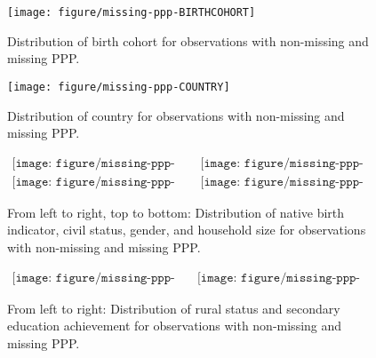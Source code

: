 \documentclass[letterpaper,11pt]{article}
\begin{document}
\begin{figure}[htb]
\centering \texttt{[image: figure/missing-ppp-BIRTHCOHORT]}
\protect\caption{Distribution of birth cohort for observations with non-missing and missing PPP.}


\label{fig:missing-birthcohort} 
\end{figure}


\begin{figure}[htb]
\centering \texttt{[image: figure/missing-ppp-COUNTRY]}
\protect\caption{Distribution of country for observations with non-missing and missing PPP.}


\label{fig:missing-country} 
\end{figure}


\begin{figure}[htb]
\begin{centering}
$\begin{array}{cc}
\texttt{[image: figure/missing-ppp-BORN.pdf]} & \texttt{[image: figure/missing-ppp-CIVIL.pdf]}\\
\texttt{[image: figure/missing-ppp-GENDER.pdf]} & \texttt{[image: figure/missing-ppp-HHSIZE.pdf]}
\end{array}$ 
\par\end{centering}

\protect\caption{From left to right, top to bottom: Distribution of native birth indicator, civil
status, gender, and household size for observations with non-missing and missing
PPP.}


\label{fig:missing1} 
\end{figure}


\begin{figure}[htb]
\begin{centering}
$\begin{array}{cc}
\texttt{[image: figure/missing-ppp-RURALFIN.pdf]} & \texttt{[image: figure/missing-ppp-SECONDARY.pdf]}\end{array}$ 
\par\end{centering}

\protect\caption{From left to right: Distribution of rural status and secondary education achievement
for observations with non-missing and missing PPP.}


\label{fig:missing2} 
\end{figure}
\end{document}
